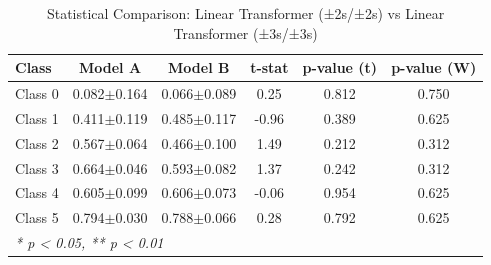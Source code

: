 \begin{table}[htbp]
\centering
\caption{Statistical Comparison: Linear Transformer (±2s/±2s) vs Linear Transformer (±3s/±3s)}
\label{tab:comparison_class_linear_transformer_±2s_±2s_vs_linear_transformer_±3s_±3s}
\begin{tabular}{lccccc}
\toprule
\textbf{Class} & \textbf{Model A} & \textbf{Model B} & \textbf{t-stat} & \textbf{p-value (t)} & \textbf{p-value (W)} \\
\midrule
Class 0 & 0.082$\pm$0.164 & 0.066$\pm$0.089 & 0.25 & 0.812 & 0.750 \\
Class 1 & 0.411$\pm$0.119 & 0.485$\pm$0.117 & -0.96 & 0.389 & 0.625 \\
Class 2 & 0.567$\pm$0.064 & 0.466$\pm$0.100 & 1.49 & 0.212 & 0.312 \\
Class 3 & 0.664$\pm$0.046 & 0.593$\pm$0.082 & 1.37 & 0.242 & 0.312 \\
Class 4 & 0.605$\pm$0.099 & 0.606$\pm$0.073 & -0.06 & 0.954 & 0.625 \\
Class 5 & 0.794$\pm$0.030 & 0.788$\pm$0.066 & 0.28 & 0.792 & 0.625 \\
\bottomrule
\multicolumn{6}{l}{\textit{* p < 0.05, ** p < 0.01}} \\
\end{tabular}
\end{table}